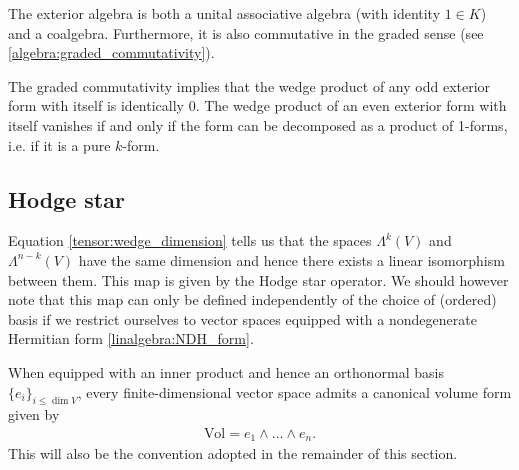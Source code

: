 
    \begin{property}
        The exterior algebra is both a unital associative algebra (with identity $1\in K$) and a coalgebra. Furthermore, it is also commutative in the graded sense (see \ref{algebra:graded_commutativity}).
    \end{property}

    \begin{property}
        The graded commutativity implies that the wedge product of any odd exterior form with itself is identically 0. The wedge product of an even exterior form with itself vanishes if and only if the form can be decomposed as a product of 1-forms, i.e. if it is a pure $k$-form.
    \end{property}

\subsection{Hodge star}

    Equation \ref{tensor:wedge_dimension} tells us that the spaces $\Lambda^k(V)$ and $\Lambda^{n-k}(V)$ have the same dimension and hence there exists a linear isomorphism between them. This map is given by the Hodge star operator. We should however note that this map can only be defined independently of the choice of (ordered) basis if we restrict ourselves to vector spaces equipped with a nondegenerate Hermitian form \ref{linalgebra:NDH_form}.

    When equipped with an inner product and hence an orthonormal basis $\{e_i\}_{i\leq\dim V}$, every finite-dimensional vector space admits a canonical volume form given by
    \begin{gather}
        \text{Vol} = e_1\wedge\ldots\wedge e_n.
    \end{gather}
    This will also be the convention adopted in the remainder of this section.



